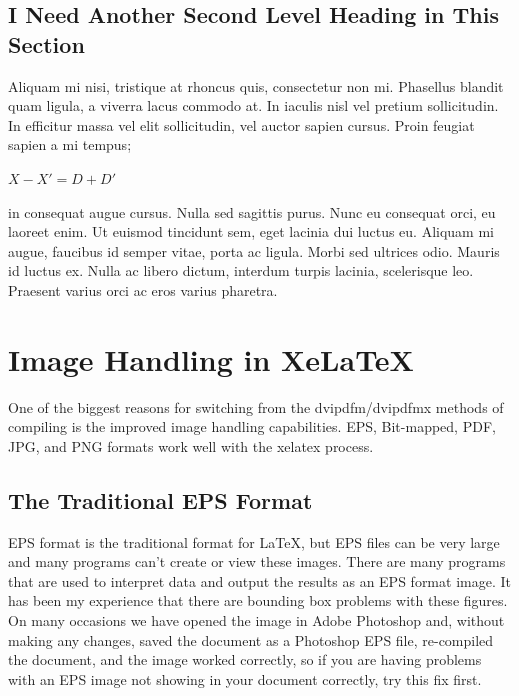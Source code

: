 \subsection{I Need Another Second Level Heading in This Section}

Aliquam mi nisi, tristique at rhoncus quis, consectetur non mi. Phasellus blandit quam ligula, a viverra lacus commodo at. In iaculis nisl vel pretium sollicitudin. In efficitur massa vel elit sollicitudin, vel auctor sapien cursus. Proin feugiat sapien a mi tempus;

 $ X-X'=D+D'$

 in consequat augue cursus. Nulla sed sagittis purus. Nunc eu consequat orci, eu laoreet enim. Ut euismod tincidunt sem, eget lacinia dui luctus eu. Aliquam mi augue, faucibus id semper vitae, porta ac ligula. Morbi sed ultrices odio. Mauris id luctus ex. Nulla ac libero dictum, interdum turpis lacinia, scelerisque leo. Praesent varius orci ac eros varius pharetra.

\section{Image Handling in XeLaTeX}

One of the biggest reasons for switching from the dvipdfm/dvipdfmx methods of compiling is the improved image handling capabilities. EPS, Bit-mapped, PDF, JPG, and PNG formats work well with the xelatex process.

\subsection{The Traditional EPS Format}

EPS format is the traditional format for LaTeX, but EPS files can be very large and many programs can't create or view these images. There are many programs that are used to interpret data and output the results as an EPS format image. It has been my experience that there are bounding box problems with these figures. On many occasions we have opened the image in Adobe Photoshop and, without making any changes, saved the document as a Photoshop EPS file, re-compiled the document, and the image worked correctly, so if you are having problems with an EPS image not showing in your document correctly, try this fix first.


